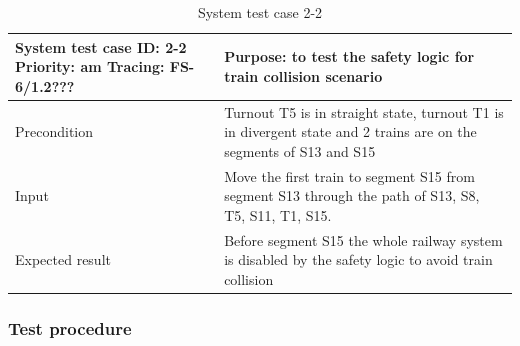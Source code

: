 \begin{table}[H]
	\caption{System test case 2-2}
	\label{table:TCase-FSS2-2}
	\begin{center}
		\renewcommand{\arraystretch}{1.8}
		\begin{tabu} 
			to 0.9 \textwidth
			{  X[0.4, c] X[c] }
			\toprule
			System test case ID: 2-2 \newline Priority: am \newline Tracing: FS-6/1.2??? & Purpose: to test the safety logic for train collision scenario                                \\ \midrule
			Precondition                                                                 & Turnout T5 is in straight state, turnout T1 is in divergent state and 2 trains are on the segments of S13 and S15                        \\
			Input                                                                        & Move the first train to segment S15 from segment S13 through the path of S13, S8, T5, S11, T1, S15. \\
			Expected result                                                              & Before segment S15 the whole railway system is disabled by the safety logic to avoid train collision                    \\ \bottomrule
		\end{tabu}
	\end{center}
\end{table}

\subsubsection{Test procedure} 
